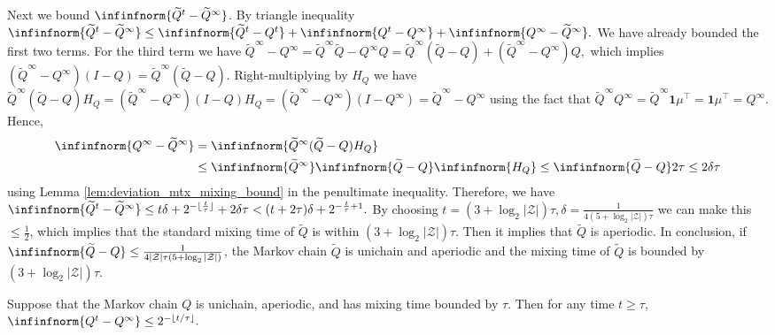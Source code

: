 \documentclass[mnsc,nonblindrev]{informs3}
\newcommand{\one}{\mathbf{1}}
\newcommand{\qtilde}{\widetilde{Q}}
\begin{document}
\begin{APPENDICES}
    Next we bound $\infinfnorm{\qtilde^t - \qtilde^\infty}$.
    By triangle inequality
    $
        \infinfnorm{\qtilde^t - \qtilde^\infty}  
        \leq \infinfnorm{\qtilde^t - Q^t} + \infinfnorm{Q^t - Q^\infty} + \infinfnorm{Q^\infty - \qtilde^\infty}.
    $
    We have already bounded the first two terms.    
    For the third term we have
    $
        \widetilde{Q}^\infty - Q^\infty 
        = \widetilde{Q}^\infty \widetilde{Q} - Q^\infty Q 
        = \widetilde{Q}^\infty (\widetilde{Q} - Q) + (\widetilde{Q}^\infty - Q^\infty)Q,
    $
    which implies
    $
        (\widetilde{Q}^\infty - Q^\infty)(I-Q)
        =\widetilde{Q}^\infty (\widetilde{Q} - Q).
    $
    Right-multiplying by $H_Q$ we have
    $
        \widetilde{Q}^\infty (\widetilde{Q} - Q)H_Q 
        = (\widetilde{Q}^\infty - Q^\infty)(I-Q)H_Q 
        = (\widetilde{Q}^\infty - Q^\infty)(I-Q^\infty) 
        = \widetilde{Q}^\infty - Q^\infty
    $
    using the fact that $\widetilde{Q}^\infty Q^\infty = \widetilde{Q}^\infty \one \mu^\top = \one \mu^\top  = Q^\infty$. Hence,
    \begin{align*}
        \infinfnorm{Q^\infty - \qtilde^\infty} &= \infinfnorm{\qtilde^\infty (\qtilde - Q) H_{Q}}\\
        &\leq \infinfnorm{\qtilde^\infty} \infinfnorm{\qtilde - Q} \infinfnorm{H_{Q}} 
         \leq \infinfnorm{\qtilde - Q} 2\tau 
         \leq 2\delta \tau
    \end{align*}
    using Lemma \ref{lem:deviation_mtx_mixing_bound} in the penultimate inequality. 
    Therefore, we have
    $
        \infinfnorm{\qtilde^t - \qtilde^\infty} \leq t \delta + 2^{-\lfloor\frac{t}{\tau}\rfloor} + 2\delta \tau< (t+2\tau)\delta + 2^{-\frac{t}{\tau}+1} .
    $
    By choosing $t=(3+\log_2 |\mathcal Z|)\tau,\delta=\frac{1}{4(5+\log_2|\mathcal Z|)\tau}$  we can make this $\leq \frac{1}{2}$, which implies that the standard mixing time of $\qtilde$ is within  $(3+\log_2 |\mathcal Z|)\tau$. Then it implies that $\qtilde$ is aperiodic. In conclusion, if $\infinfnorm{\widetilde{Q} - Q} \leq \frac{1}{4|\mathcal Z|\tau (5 + \log_2 |\mathcal Z|)}$, the Markov chain $\qtilde$ is unichain and aperiodic and the mixing time of $\qtilde$ is bounded by $(3+\log_2|\mathcal Z|) \tau$.
\endproof
\begin{lemma}\label{lem:Qt-Qinfty}
    Suppose that the Markov chain $Q$ is unichain, aperiodic, and has mixing time bounded by $\tau$. Then for any time $t\ge \tau$,
    \(
\infinfnorm{Q^t - Q^\infty}\le2^{-\lfloor t/\tau\rfloor}.
\)
\end{lemma}

\end{APPENDICES}
\end{document}
